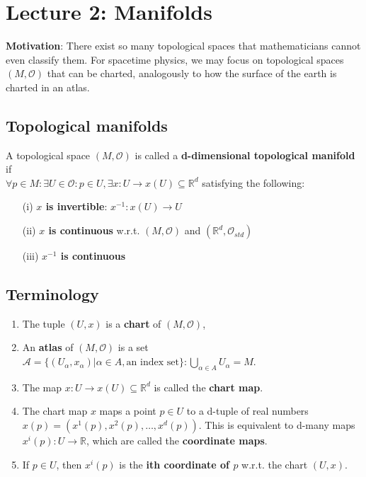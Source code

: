 \section{Lecture 2: Manifolds}

\begin{framed}
\textbf{Motivation}: There exist so many topological spaces that mathematicians cannot even classify them. For spacetime physics, we may focus on topological spaces $(M, \mathcal{O})$ that can be charted, analogously to how the surface of the earth is charted in an atlas.
\end{framed}

\subsection{Topological manifolds}
\begin{definition}
  A topological space $(M, \mathcal{O})$ is called a \textbf{d-dimensional topological manifold} if \\
  $\forall p \in M : \exists U \in \mathcal{O} : p \in U, \exists x : U \to x(U) \subseteq \mathbb{R}^d$ satisfying the following:
\begin{enumerate}
\item[(i)] \textbf{$x$ is invertible}: $x^{-1} : x(U) \to U$
\item[(ii)] \textbf{$x$ is continuous} w.r.t. $(M, \mathcal{O})$ and $(\mathbb{R}^d, \mathcal{O}_{std})$
\item[(iii)] \textbf{$x^{-1}$ is continuous}
\end{enumerate}
\end{definition}

\subsection{Terminology}
\begin{enumerate}
\item The tuple $(U , x)$ is a \textbf{chart} of $(M, \mathcal{O})$,
\item An \textbf{atlas} of $(M, \mathcal{O})$ is a set $\mathcal{A} = \lbrace (U_{\alpha}, x_{\alpha}) | \alpha \in A, \text{an index set} \rbrace : \bigcup_{\alpha \in A}U_{\alpha} = M$.
\item The map $x : U \to x(U) \subseteq \mathbb{R}^d$ is called the \textbf{chart map}.
\item The chart map $x$ maps a point $ p \in U$ to a d-tuple of real numbers $x(p) = (x^1(p), x^2(p), \dots , x^d(p))$. This is equivalent to d-many maps $x^i(p): U \to \mathbb{R}$, which are called the \textbf{coordinate maps}. 
\item If $p \in U$, then $x^i(p)$ is the \textbf{ith coordinate of $p$} w.r.t. the chart $(U, x)$.
\end{enumerate}


